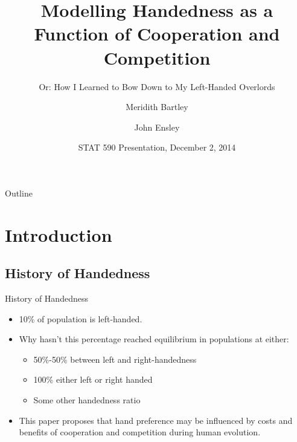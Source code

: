 \documentclass{beamer}
\title{Modelling Handedness as a Function of Cooperation and Competition}
\subtitle{Or: How I Learned to Bow Down to My Left-Handed Overlords}
\author{Meridith Bartley \and John Ensley}
\institute[The Pennsylvania State University] %
{
  Department of Statistics\\
  The Pennsylvania State University
  }
\date{STAT 590 Presentation, December 2, 2014}
\begin{document}
\begin{frame}
  \titlepage
\end{frame}

\begin{frame}{Outline}
  \tableofcontents
\end{frame}

\section{Introduction}

    \subsection{History of Handedness}

    \begin{frame}{History of Handedness}%
      \begin{itemize}
      \item {
        10\% of population is left-handed. 
      }
      \item {
        Why hasn't this percentage reached equilibrium in populations at either:
        \begin{itemize}
          \item 50\%-50\% between left and right-handedness
          \item 100\% either left or right handed 
          \item Some other handedness ratio 
        \end{itemize}
      }
      \item{
      This paper proposes that hand preference may be influenced by costs and benefits of cooperation and competition during human evolution.
      }
      \end{itemize}
    \end{frame}

\end{document}
